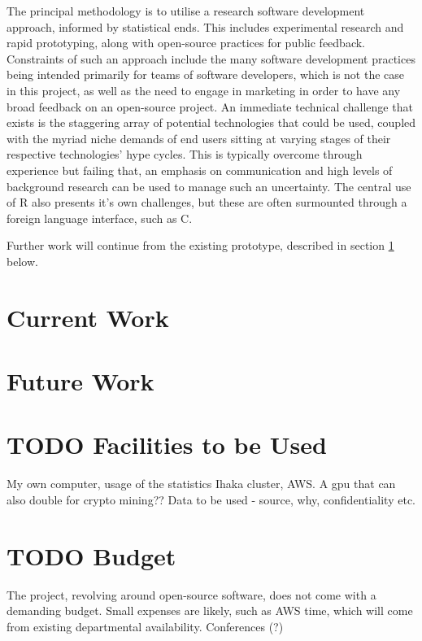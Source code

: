 \documentclass[a4paper,10pt]{article}
\begin{document}
The principal methodology is to utilise a research software development approach, informed by statistical ends.
This includes experimental research and rapid prototyping, along with open-source practices for public feedback.
Constraints of such an approach include the many software development practices being intended primarily for teams of software developers, which is not the case in this project, as well as the need to engage in marketing in order to have any broad feedback on an open-source project.
An immediate technical challenge that exists is the staggering array of potential technologies that could be used, coupled with the myriad niche demands of end users sitting at varying stages of their respective technologies' hype cycles.
This is typically overcome through experience but failing that, an emphasis on communication and high levels of background research can be used to manage such an uncertainty.
The central use of R also presents it's own challenges, but these are often surmounted through a foreign language interface, such as C.

Further work will continue from the existing prototype, described in section \ref{curr} below.

\section{Current Work}\label{curr}



\section{Future Work}

\section{TODO Facilities to be Used}

My own computer, usage of the statistics Ihaka cluster, AWS.
A gpu that can also double for crypto mining??
Data to be used - source, why, confidentiality etc.

\section{TODO Budget}

The project, revolving around open-source software, does not come with a demanding budget.
Small expenses are likely, such as AWS time, which will come from existing departmental availability.
Conferences (?)
\end{document}
